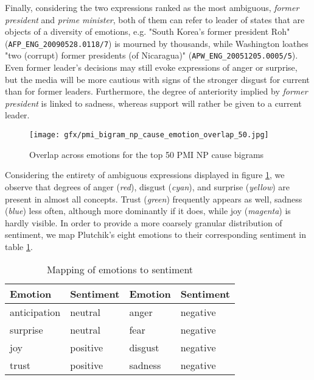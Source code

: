 Finally, considering the two expressions ranked as the most ambiguous, \textit{former president} and \textit{prime minister}, both of them can refer to leader of states that are objects of a diversity of emotions, e.g. "South Korea's former president Roh" (\texttt{AFP\_ENG\_20090528.0118/7}) is mourned by thousands, while Washington loathes "two (corrupt) former presidents (of Nicaragua)" (\texttt{APW\_ENG\_20051205.0005/5}). Even former leader's decisions may still evoke expressions of anger or surprise, but the media will be more cautious with signs of the stronger disgust for current than for former leaders. Furthermore, the degree of anteriority implied by \textit{former president} is linked to sadness, whereas support will rather be given to a current leader.

\begin{figure}[bth]
\texttt{[image: gfx/pmi\_bigram\_np\_cause\_emotion\_overlap\_50.jpg]}
\caption{Overlap across emotions for the top 50 PMI NP cause bigrams}\label{fig:pmi-bigram-np-cause-emotion-overlap-50}
\end{figure}

Considering the entirety of ambiguous expressions displayed in figure \ref{fig:pmi-bigram-np-cause-emotion-overlap-50}, we observe that degrees of anger (\textit{red}), disgust (\textit{cyan}), and surprise (\textit{yellow}) are present in almost all concepts. Trust (\textit{green}) frequently appears as well, sadness (\textit{blue}) less often, although more dominantly if it does, while joy (\textit{magenta}) is hardly visible. In order to provide a more coarsely granular distribution of sentiment, we map Plutchik's eight emotions to their corresponding sentiment in table \ref{tab:emotion2sentiment}.

\begin{table}[]
\centering
\begin{tabular}{l|l||l|l}
{\bf Emotion} & {\bf Sentiment} & {\bf Emotion} & {\bf Sentiment} \\\hline
anticipation  & neutral & anger & negative        \\
surprise      & neutral & fear  & negative        \\
joy           & positive & disgust & negative        \\
trust         & positive & sadness & negative       
\end{tabular}
\caption{Mapping of emotions to sentiment}
\label{tab:emotion2sentiment}
\end{table}

